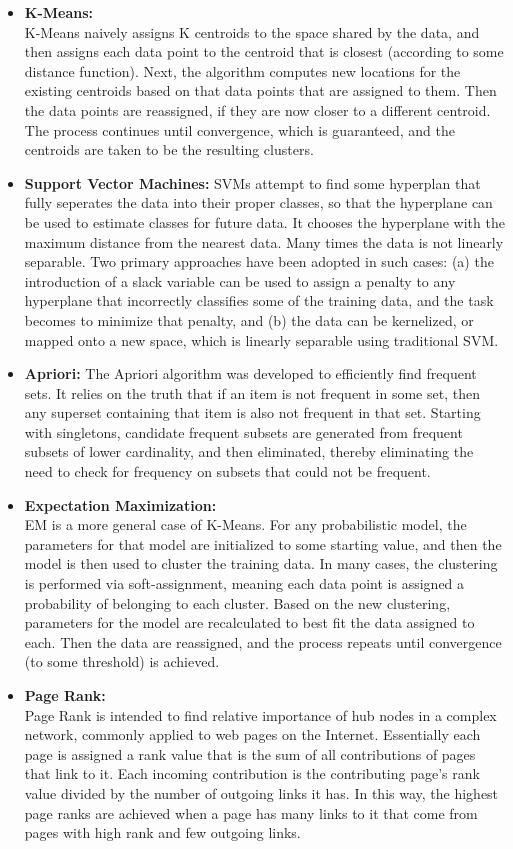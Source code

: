 \documentclass[fleqn,10pt]{SelfArx} %
\begin{document}
\begin{itemize}
	\item{\textbf{K-Means:}}\\ K-Means naively assigns K centroids to the space shared by the data, and then assigns each data point to the centroid that is closest (according to some distance function).  Next, the algorithm computes new locations for the existing centroids based on that data points that are assigned to them.  Then the data points are reassigned, if they are now closer to a different centroid.  The process continues until convergence, which is guaranteed, and the centroids are taken to be the resulting clusters.
	\item{\textbf{Support Vector Machines:}} SVMs attempt to find some hyperplan that fully seperates the data into their proper classes, so that the hyperplane can be used to estimate classes for future data.  It chooses the hyperplane with the maximum distance from the nearest data.  Many times the data is not linearly separable.  Two primary approaches have been adopted in such cases: (a) the introduction of a slack variable can be used to assign a penalty to any hyperplane that incorrectly classifies some of the training data, and the task becomes to minimize that penalty, and (b) the data can be kernelized, or mapped onto a new space, which is linearly separable using traditional SVM. 
	\item{\textbf{Apriori:}} The Apriori algorithm was developed to efficiently find frequent sets.  It relies on the truth that if an item is not frequent in some set, then any superset containing that item is also not frequent in that set.  Starting with singletons, candidate frequent subsets are generated from frequent subsets of lower cardinality, and then eliminated, thereby eliminating the need to check for frequency on subsets that could not be frequent.
	\item{\textbf{Expectation Maximization:}}\\ EM is a more general case of K-Means.  For any probabilistic model, the parameters for that model are initialized to some starting value, and then the model is then used to cluster the training data.  In many cases, the clustering is performed via soft-assignment, meaning each data point is assigned a probability of belonging to each cluster.  Based on the new clustering, parameters for the model are recalculated to best fit the data assigned to each.  Then the data are reassigned, and the process repeats until convergence (to some threshold) is achieved.
	\item{\textbf{Page Rank:}}\\ Page Rank is intended to find relative importance of hub nodes in a complex network, commonly applied to web pages on the Internet.  Essentially each page is assigned a rank value that is the sum of all contributions of pages that link to it.  Each incoming contribution is the contributing page's rank value divided by the number of outgoing links it has.  In this way, the highest page ranks are achieved when a page has many links to it that come from pages with high rank and few outgoing links.

\end{itemize}
\end{document}
